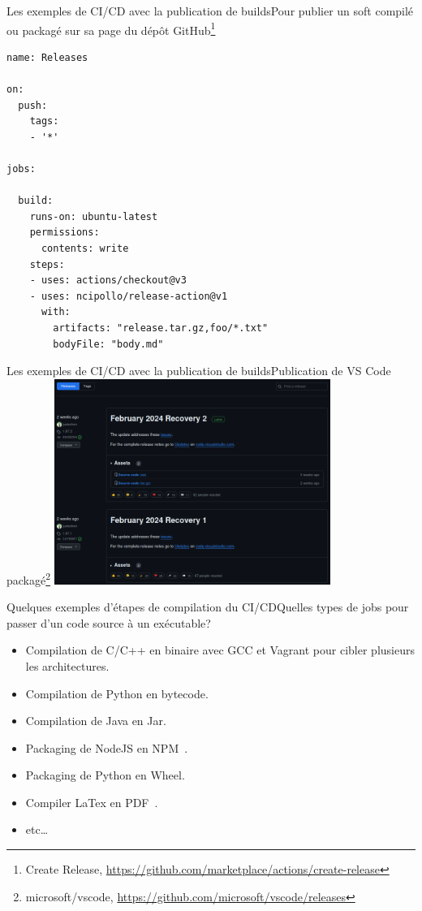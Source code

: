 \documentclass{beamer}
\begin{document}
    \begin{frame}[fragile]{Les exemples de CI/CD avec la publication de builds}{Pour publier un soft compilé ou packagé sur sa page du dépôt GitHub\footnote{Create Release, \url{https://github.com/marketplace/actions/create-release}}}
        \transdissolve
        \begin{lstlisting}
name: Releases

on:
  push:
    tags:
    - '*'

jobs:

  build:
    runs-on: ubuntu-latest
    permissions:
      contents: write
    steps:
    - uses: actions/checkout@v3
    - uses: ncipollo/release-action@v1
      with:
        artifacts: "release.tar.gz,foo/*.txt"
        bodyFile: "body.md"
        \end{lstlisting}
    \end{frame}

    \begin{frame}{Les exemples de CI/CD avec la publication de builds}{Publication de VS Code packagé\footnote{microsoft/vscode, \url{https://github.com/microsoft/vscode/releases}}}
        \transdissolve
        \centering
        \includegraphics[width=9cm]{image/vs-code-release}
    \end{frame}

    \begin{frame}{Quelques exemples d'étapes de compilation du CI/CD}{Quelles types de jobs pour passer d'un code source à un exécutable?}
        \transdissolve
        \pause
        \begin{itemize}
            \item Compilation de C/C++ en binaire avec GCC et Vagrant pour cibler plusieurs les architectures.
            \item Compilation de Python en bytecode.
            \item Compilation de Java en Jar.
            \item Packaging de NodeJS en NPM~.
            \item Packaging de Python en Wheel.
            \item Compiler LaTex en PDF~.
            \item etc\ldots
        \end{itemize}
    \end{frame}
\end{document}
